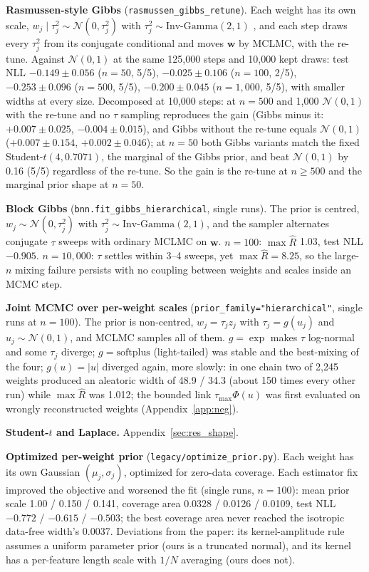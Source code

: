 \documentclass[11pt]{article}
\newcommand{\nzo}{\mathcal{N}(0,1)}
\newcommand{\code}[1]{\texttt{#1}}
\begin{document}
\textbf{Rasmussen-style Gibbs} (\code{rasmussen\_gibbs\_retune}). Each weight has its own scale, $w_j\mid\tau_j^2\sim\mathcal N(0,\tau_j^2)$ with
$\tau_j^2\sim\text{Inv-Gamma}(2,1)$ \citep{rasmussen1995practical}, and each step draws every $\tau_j^2$
from its conjugate conditional and moves $\mathbf w$ by MCLMC, with the re-tune. Against $\nzo$ at the same 125{,}000 steps and 10{,}000 kept
draws: test NLL $-0.149\pm0.056$ ($n=50$, 5/5), $-0.025\pm0.106$ ($n=100$, 2/5), $-0.253\pm0.096$ ($n=500$, 5/5),
$-0.200\pm0.045$ ($n=1{,}000$, 5/5), with smaller widths at every size. Decomposed at 10{,}000 steps: at $n=500$ and
1{,}000 $\nzo$ with the re-tune and no $\tau$ sampling reproduces the gain (Gibbs minus it: $+0.007\pm0.025$,
$-0.004\pm0.015$), and Gibbs without the re-tune equals $\nzo$ ($+0.007\pm0.154$, $+0.002\pm0.046$); at $n=50$ both Gibbs
variants match the fixed Student-$t(4,0.7071)$, the marginal of the Gibbs prior, and beat $\nzo$ by 0.16 (5/5)
regardless of the re-tune. So the gain is the re-tune at $n\ge500$ and the marginal prior shape at $n=50$.

\textbf{Block Gibbs} (\code{bnn.fit\_gibbs\_hierarchical}, single runs). The prior is centred, $w_j\sim\mathcal N(0,\tau_j^2)$ with
$\tau_j^2\sim\text{Inv-Gamma}(2,1)$, and the sampler alternates conjugate $\tau$ sweeps with ordinary MCLMC on $\mathbf w$. $n=100$:
$\max\widehat R$ 1.03, test NLL $-0.905$. $n=10{,}000$: $\tau$ settles within 3--4 sweeps, yet $\max\widehat R=8.25$,
so the large-$n$ mixing failure persists with no coupling between weights and scales inside an MCMC step.

\textbf{Joint MCMC over per-weight scales} (\code{prior\_family="hierarchical"}, single runs at $n=100$).
The prior is non-centred, $w_j=\tau_j z_j$ with $\tau_j=g(u_j)$ and $u_j\sim\mathcal N(0,1)$, and MCLMC samples all of them. $g=\exp$ makes $\tau$
log-normal and some $\tau_j$ diverge; $g=\mathrm{softplus}$ (light-tailed) was stable and the best-mixing of the
four; $g(u)=|u|$ diverged again, more slowly: in one chain two of 2{,}245 weights produced an aleatoric width of
48.9 / 34.3 (about 150 times every other run) while $\max\widehat R$ was 1.012; the bounded link
$\tau_{\max}\Phi(u)$ was first evaluated on wrongly reconstructed weights (Appendix~\ref{app:neg}).

\textbf{Student-$t$ and Laplace.} Appendix~\ref{sec:res_shape}.

\textbf{Optimized per-weight prior} \citep{delaunoy2024lowbudget} (\code{legacy/optimize\_prior.py}). Each weight
has its own Gaussian $(\mu_j,\sigma_j)$, optimized for zero-data coverage. Each estimator fix improved the objective and worsened
the fit (single runs, $n=100$): mean prior scale 1.00 / 0.150 / 0.141, coverage area 0.0328 / 0.0126 / 0.0109, test NLL
$-0.772$ / $-0.615$ / $-0.503$; the best coverage area never reached the isotropic data-free width's 0.0037. Deviations from the
paper: its kernel-amplitude rule assumes a uniform parameter prior (ours is a truncated normal), and its kernel has a
per-feature length scale with $1/N$ averaging (ours does not).
\end{document}

